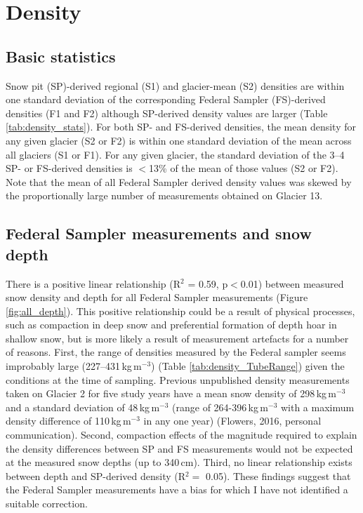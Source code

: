 \documentclass{sfuthesis}
\begin{document}
{%
\section{Density}
\label{sec:density}

\subsection{Basic statistics}

Snow pit (SP)-derived regional (S1) and glacier-mean (S2) densities are within one standard deviation of the corresponding Federal Sampler (FS)-derived densities (F1 and F2) although SP-derived density values are larger (Table \ref{tab:density_stats}). For both SP- and FS-derived densities, the mean density for any given glacier (S2 or F2) is within one standard deviation of the mean across all glaciers (S1 or F1). For any given glacier, the standard deviation of the 3--4 SP- or FS-derived densities is $<$13\% of the mean of those values (S2 or F2). Note that the mean of all Federal Sampler derived density values was skewed by the proportionally large number of measurements obtained on Glacier 13.

\subsection{Federal Sampler measurements and snow depth}
\label{sec:FSdensity&depth}

There is a positive linear relationship (R$^2$ = 0.59, p$<$0.01) between measured snow density and depth for all Federal Sampler measurements (Figure \ref{fig:all_depth}). This positive relationship could be a result of physical processes, such as compaction in deep snow and preferential formation of depth hoar in shallow snow, but is more likely a result of measurement artefacts for a number of reasons. First, the range of densities measured by the Federal sampler seems improbably large {\color{red} (227--431\,kg\,m$^{-3}$) (Table \ref{tab:density_TubeRange}) } given the conditions at the time of sampling. Previous unpublished density measurements taken on Glacier 2 for five study years have a mean snow density of 298\,kg\,m$^{-3}$ and a standard deviation of 48\,kg\,m$^{-3}$ (range of 264-396\,kg\,m$^{-3}$ with a maximum density difference of 110\,kg\,m$^{-3}$ in any one year) (Flowers, 2016, personal communication). Second, compaction effects of the magnitude required to explain the density differences between SP and FS measurements would not be expected at the measured snow depths (up to 340\,cm). Third, no linear relationship exists between depth and SP-derived density (R$^2 =$ 0.05). These findings suggest that the Federal Sampler measurements have a bias for which I have not identified a suitable correction. 

}
\end{document}
